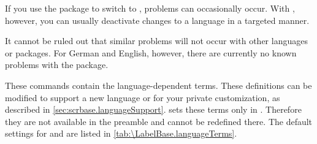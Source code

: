 If you use the  package to switch to
, problems can occasionally occur. With ,
however, you can usually deactivate changes to a language in a targeted
manner.%
\iffalse%
\ If the package \Package{french} is not installed, the problem with
  \Package{babel} does not arise. Similarly, the problem usually does not
  exist when you use \Package{babel} with other varieties of French such as
  \PValue{acadian}, \PValue{canadien}, \PValue{francais} or \PValue{frenchb}
  instead of \PValue{french}.
\fi

\iffalse%
  However, with \Package{babel} version 3.7j and above, this problem only occurs
  if the option explicitly indicates that \Package{babel} should use the
  \Package{french} package.
%
\iftrue
  If you cannot be sure you are not using an old version of \Package{babel}, I
  recommend you use
\begin{lstcode}
  \usepackage[...,frenchb,...]{babel}
\end{lstcode}
  to select French.
    \iffalse %
      If necessary, you can still switch to French with
      \Macro{selectlanguage}\PParameter{french}.%
    \fi%
\fi 
\fi  

\iftrue
  It cannot be ruled out that similar problems will not occur with other
  languages or packages. For German and English, however, there are currently
  no known problems with the  package.
\fi


\begin{Declaration}
\end{Declaration}
These commands contain the language-dependent terms. These definitions can be
modified to support a new language or for your private customization, as
described in
\autoref{sec:scrbase.languageSupport}. \KOMAScript{} sets these terms only in
. Therefore they are not available in the
preamble and cannot be redefined there. The default settings for
 and  are listed in
\autoref{tab:\LabelBase.languageTerms}.%
\EndIndexGroup

